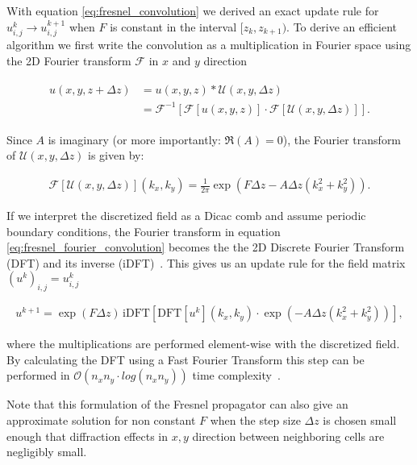 

With equation \eqref{eq:fresnel_convolution} we derived an exact update rule for $u_{i,j}^{k} \rightarrow u_{i,j}^{k+1}$ when $F$ is constant in the interval $[z_k,z_{k+1})$. To derive an efficient algorithm we first write the convolution as a multiplication in Fourier space using the 2D Fourier transform $\mathscr{F}$ in $x$ and $y$ direction~\cite{wiki:convolution_theorem}

\begin{align} \label{eq:fresnel_fourier_convolution}
\begin{split}
u(x,y,z+\Delta z) &= u(x,y,z) * \mathcal{U}(x,y,\Delta z) \\
&= \mathscr{F}^{-1}[ \mathscr{F}[u(x,y,z)] \cdot \mathscr{F}[\mathcal{U}(x,y,\Delta z)] ].
\end{split}
\end{align}

Since $A$ is imaginary (or more importantly: $\Re(A) = 0$), the Fourier transform of $\mathcal{U}(x,y,\Delta z)$ is given by:

\begin{align*}
\mathscr{F}[\mathcal{U}(x,y,\Delta z)](k_x,k_y) = \frac{1}{2 \pi} \exp \! \left( F \Delta z - A \Delta z (k_x^2+k_y^2)\right).
\end{align*}

If we interpret the discretized field as a Dicac comb and assume periodic boundary conditions, the Fourier transform in equation \eqref{eq:fresnel_fourier_convolution} becomes the the 2D Discrete Fourier Transform (DFT) and its inverse (iDFT)~\cite{wiki:DFT}. This gives us an update rule for the field matrix $(u^k)_{i,j} = u^k_{i,j}$

\begin{align} \label{eq:fresnel_DFT}
u^{k+1} = \exp(F \Delta z)  \, \mathrm{iDFT} \! \left[ \mathrm{DFT} \! \left[ u^{k} \right]\!(k_x,k_y) \cdot \exp \! \left(-A \Delta z (k_x^2+k_y^2)\right) \right],
\end{align}

where the multiplications are performed element-wise with the discretized field. By calculating the DFT using a Fast Fourier Transform this step can be performed in $\mathcal{O}(n_x n_y \cdot log(n_x n_y))$ time complexity~\cite{wiki:FFT}.

Note that this formulation of the Fresnel propagator can also give an approximate solution for non constant $F$ when the step size $\Delta z$ is chosen small enough that diffraction effects in $x,y$ direction between neighboring cells are negligibly small.















